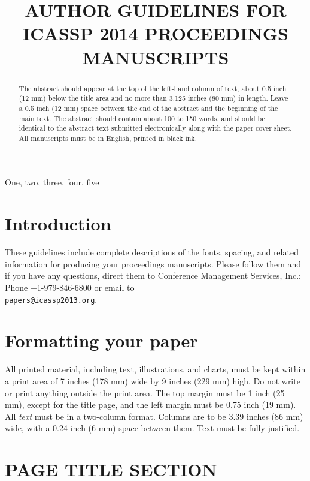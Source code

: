 \documentclass{article}
\title{AUTHOR GUIDELINES FOR ICASSP 2014 PROCEEDINGS MANUSCRIPTS}
\begin{document}
\topmargin=0mm

%
\maketitle
%
\begin{abstract}
The abstract should appear at the top of the left-hand column of text, about
0.5 inch (12 mm) below the title area and no more than 3.125 inches (80 mm) in
length.  Leave a 0.5 inch (12 mm) space between the end of the abstract and the
beginning of the main text.  The abstract should contain about 100 to 150
words, and should be identical to the abstract text submitted electronically
along with the paper cover sheet.  All manuscripts must be in English, printed
in black ink.
\end{abstract}
%
\begin{keywords}
One, two, three, four, five
\end{keywords}
%
\section{Introduction}
\label{sec:intro}

These guidelines include complete descriptions of the fonts, spacing, and
related information for producing your proceedings manuscripts. Please follow
them and if you have any questions, direct them to Conference Management
Services, Inc.: Phone +1-979-846-6800 or email
to \\\texttt{papers@icassp2013.org}.

\section{Formatting your paper}
\label{sec:format}

All printed material, including text, illustrations, and charts, must be kept
within a print area of 7 inches (178 mm) wide by 9 inches (229 mm) high. Do
not write or print anything outside the print area. The top margin must be 1
inch (25 mm), except for the title page, and the left margin must be 0.75 inch
(19 mm).  All {\it text} must be in a two-column format. Columns are to be 3.39
inches (86 mm) wide, with a 0.24 inch (6 mm) space between them. Text must be
fully justified.

\section{PAGE TITLE SECTION}
\label{sec:pagestyle}
\end{document}
